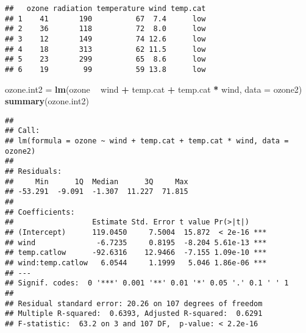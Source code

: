 \documentclass[ignorenonframetext,]{beamer}
\newenvironment{Shaded}{\begin{snugshade}}{\end{snugshade}}
\newcommand{\KeywordTok}[1]{\textcolor[rgb]{0.13,0.29,0.53}{\textbf{#1}}}
\newcommand{\DataTypeTok}[1]{\textcolor[rgb]{0.13,0.29,0.53}{#1}}
\newcommand{\StringTok}[1]{\textcolor[rgb]{0.31,0.60,0.02}{#1}}
\newcommand{\OperatorTok}[1]{\textcolor[rgb]{0.81,0.36,0.00}{\textbf{#1}}}
\newcommand{\NormalTok}[1]{#1}
\begin{document}
\begin{frame}[fragile]

\footnotesize

\begin{Shaded}
\end{Shaded}

\begin{verbatim}
##   ozone radiation temperature wind temp.cat
## 1    41       190          67  7.4      low
## 2    36       118          72  8.0      low
## 3    12       149          74 12.6      low
## 4    18       313          62 11.5      low
## 5    23       299          65  8.6      low
## 6    19        99          59 13.8      low
\end{verbatim}

\begin{Shaded}
\begin{Highlighting}[]
\NormalTok{ozone.int2 =}\StringTok{ }\KeywordTok{lm}\NormalTok{(ozone }\OperatorTok{~}\StringTok{ }\NormalTok{wind }\OperatorTok{+}\StringTok{ }\NormalTok{temp.cat }\OperatorTok{+}\StringTok{ }\NormalTok{temp.cat }\OperatorTok{*}\StringTok{ }\NormalTok{wind, }\DataTypeTok{data =}\NormalTok{ ozone2)}
\KeywordTok{summary}\NormalTok{(ozone.int2)}
\end{Highlighting}
\end{Shaded}

\begin{verbatim}
## 
## Call:
## lm(formula = ozone ~ wind + temp.cat + temp.cat * wind, data = ozone2)
## 
## Residuals:
##     Min      1Q  Median      3Q     Max 
## -53.291  -9.091  -1.307  11.227  71.815 
## 
## Coefficients:
##                  Estimate Std. Error t value Pr(>|t|)    
## (Intercept)      119.0450     7.5004  15.872  < 2e-16 ***
## wind              -6.7235     0.8195  -8.204 5.61e-13 ***
## temp.catlow      -92.6316    12.9466  -7.155 1.09e-10 ***
## wind:temp.catlow   6.0544     1.1999   5.046 1.86e-06 ***
## ---
## Signif. codes:  0 '***' 0.001 '**' 0.01 '*' 0.05 '.' 0.1 ' ' 1
## 
## Residual standard error: 20.26 on 107 degrees of freedom
## Multiple R-squared:  0.6393, Adjusted R-squared:  0.6291 
## F-statistic:  63.2 on 3 and 107 DF,  p-value: < 2.2e-16
\end{verbatim}

\normalsize

\end{frame}
\end{document}
